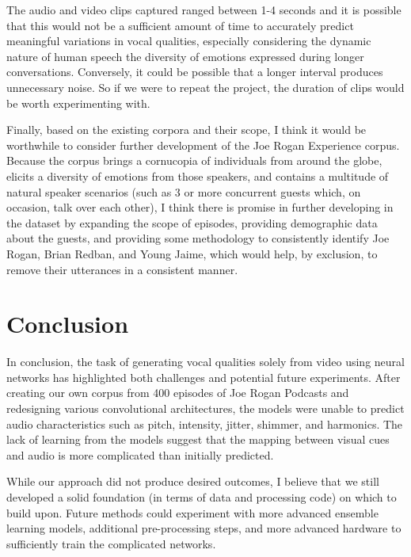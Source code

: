 \documentclass[10pt,twocolumn,letterpaper]{article}
\begin{document}
The audio and video clips captured ranged between 1-4 seconds and it is possible that this would not be a sufficient amount of time to accurately predict meaningful variations in vocal qualities, especially considering the dynamic nature of human speech the diversity of emotions expressed during longer conversations. Conversely, it could be possible that a longer interval produces unnecessary noise. So if we were to repeat the project, the duration of clips would be worth experimenting with. 

Finally, based on the existing corpora and their scope, I think it would be worthwhile to consider further development of the Joe Rogan Experience corpus. Because the corpus brings a cornucopia of individuals from around the globe, elicits a diversity of emotions from those speakers, and contains a multitude of natural speaker scenarios (such as 3 or more concurrent guests which, on occasion, talk over each other), I think there is promise in further developing in the dataset by expanding the scope of episodes, providing demographic data about the guests, and providing some methodology to consistently identify Joe Rogan, Brian Redban, and Young Jaime, which would help, by exclusion, to remove their utterances in a consistent manner. 

\section{Conclusion}
\label{sec:conclusion}

In conclusion, the task of generating vocal qualities solely from video using neural networks has highlighted both challenges and potential future experiments. After creating our own corpus from 400 episodes of Joe Rogan Podcasts and redesigning various convolutional architectures, the models were unable to predict audio characteristics such as pitch, intensity, jitter, shimmer, and harmonics. The lack of learning from the models suggest that the mapping between visual cues and audio is more complicated than initially predicted.

While our approach did not produce desired outcomes, I believe that we still developed a solid foundation (in terms of data and processing code) on which to build upon. Future methods could experiment with more advanced ensemble learning models, additional pre-processing steps, and more advanced hardware to sufficiently train the complicated networks. 
\end{document}
